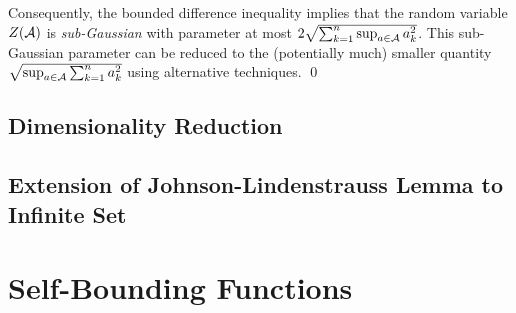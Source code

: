 \documentclass[11pt]{article}
\begin{document}
\begin{itemize}
\begin{example}
Consequently, the bounded difference inequality implies that the random variable $Z({\mathcal A})$ is \emph{sub-Gaussian} with parameter at most $2 \sqrt{\sum_{k=1}^{n}\sup_{a \in {\mathcal A}}a_k^2}$. This sub-Gaussian parameter can be reduced to the (potentially much) smaller quantity $\sqrt{\sup_{a \in {\mathcal A}}\sum_{k=1}^{n}a_k^2}$ using alternative techniques. \qed
\end{example}
\end{itemize}
\subsection{Dimensionality Reduction}

\subsection{Extension of Johnson-Lindenstrauss Lemma to Infinite Set}


\section{Self-Bounding Functions}
\end{document}
